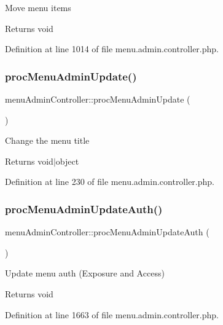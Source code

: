 Move menu items \begin{DoxyReturn}{Returns}
void 
\end{DoxyReturn}


Definition at line 1014 of file menu.\+admin.\+controller.\+php.

\hypertarget{classmenuAdminController_a5069ab275f8531a71d6f14b08e4bc778}{}\label{classmenuAdminController_a5069ab275f8531a71d6f14b08e4bc778} 
\subsubsection{\texorpdfstring{proc\+Menu\+Admin\+Update()}{procMenuAdminUpdate()}}
{\footnotesize\ttfamily menu\+Admin\+Controller\+::proc\+Menu\+Admin\+Update (\begin{DoxyParamCaption}{ }\end{DoxyParamCaption})}

Change the menu title \begin{DoxyReturn}{Returns}
void$\vert$object 
\end{DoxyReturn}


Definition at line 230 of file menu.\+admin.\+controller.\+php.

\hypertarget{classmenuAdminController_aa7ae548464c3919b04a2153b6f9f2459}{}\label{classmenuAdminController_aa7ae548464c3919b04a2153b6f9f2459} 
\subsubsection{\texorpdfstring{proc\+Menu\+Admin\+Update\+Auth()}{procMenuAdminUpdateAuth()}}
{\footnotesize\ttfamily menu\+Admin\+Controller\+::proc\+Menu\+Admin\+Update\+Auth (\begin{DoxyParamCaption}{ }\end{DoxyParamCaption})}

Update menu auth (Exposure and Access) \begin{DoxyReturn}{Returns}
void 
\end{DoxyReturn}


Definition at line 1663 of file menu.\+admin.\+controller.\+php.

